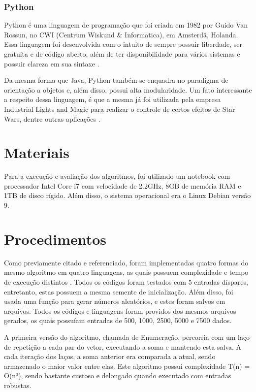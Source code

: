 \documentclass[
	12pt,				%
	oneside,   	        %
	a4paper,			%
	english,			%
	french,				%
	spanish,			%
	brazil,				%
	]{pacotes/abntex2}
\begin{document}
        \subsubsection{Python}
            Python é uma linguagem de programação que foi criada em 1982 por Guido Van Rossun, no CWI (Centrum Wiskund \& Informatica), em Amsterdâ, Holanda. Essa linguagem foi desenvolvida com o intuito de sempre possuir liberdade, ser gratuita e de código aberto, além de ter disponibilidade para vários sistemas e possuir clareza em sua sintaxe \cite{art4}.
            
            Da mesma forma que Java, Python também se enquadra no paradigma de orientação a objetos e, além disso, possui alta modularidade. Um fato interessante a respeito dessa linguagem, é que a mesma já foi utilizada pela empresa Industrial Lights and Magic para realizar o controle de certos efeitos de Star Wars, dentre outras aplicações \cite{art4}.

\section{Materiais}
\label{sec:materiais}
    Para a execução e avaliação dos algoritmos, foi utilizado um notebook com processador Intel Core i7 com velocidade de 2.2GHz, 8GB de memória RAM e 1TB de disco rígido. Além disso, o sistema operacional era o Linux Debian versão 9.

\section{Procedimentos}
\label{sec:procedimentos}
    Como previamente citado e referenciado, foram implementadas quatro formas do mesmo algoritmo em quatro linguagens, as quais possuem complexidade e tempo de execução distintos \cite{art6}. Todos os códigos foram testados com 5 entradas díspares, entretanto, estas possuem a mesma semente de inicialização. Além disso, foi usada uma função para gerar números aleatórios, e estes foram salvos em arquivos. Todos os códigos e linguagens foram providos dos mesmos arquivos gerados, os quais possuíam entradas de 500, 1000, 2500, 5000 e 7500 dados.
    
    A primeira versão do algoritmo, chamada de Enumeração, percorria com um laço de repetição a cada par do vetor, executando a soma e mantendo esta salva. A cada iteração dos laços, a soma anterior era comparada a atual, sendo armazenado o maior valor entre elas. Este algoritmo possui complexidade T(n) = O(n³), sendo bastante custoso e delongado quando executado com entradas robustas.
    
\end{document}
